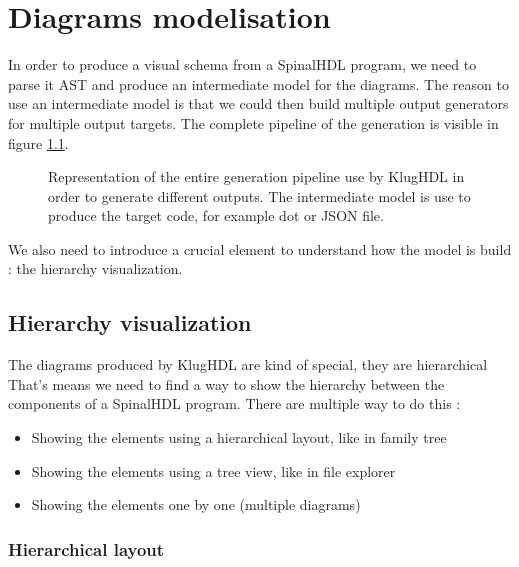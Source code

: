 \chapter{Diagrams modelisation}

In order to produce a visual schema from a SpinalHDL program, we need to parse
it AST and produce an intermediate model for the diagrams. The reason to use
an intermediate model is that we could then build multiple output generators
for multiple output targets. The complete pipeline of the generation is visible
in figure \ref{fig:generation-pipeline}.

\begin{figure}[H]
    \centering
    \caption[KlugHDL generation pipeline]{Representation of the entire generation
      pipeline use by KlugHDL in order to generate different outputs. The
      intermediate model is use to produce the target code, for example dot or
      JSON file.}
    \label{fig:generation-pipeline}
\end{figure}

We also need to introduce a crucial element to understand how the model is
build : the hierarchy visualization.

\section{Hierarchy visualization}

The diagrams produced by KlugHDL are kind of special, they are hierarchical
That's means we need to find a way to show the hierarchy between the components
of a SpinalHDL program. There are multiple way to do this :
\begin{itemize}
  \item Showing the elements using a hierarchical layout, like in family tree
  \item Showing the elements using a tree view, like in file explorer
  \item Showing the elements one by one (multiple diagrams)
\end{itemize}

\subsection{Hierarchical layout}
\label{sec:hierarchical-layout}

